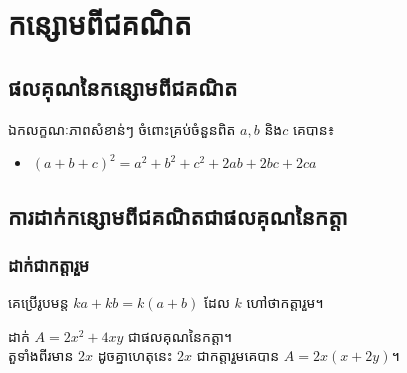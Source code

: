 \chapter{កន្សោមពីជគណិត}
\section{ផលគុណនៃកន្សោមពីជគណិត}
\begin{property}{ឯកលក្ខណៈភាពសំខាន់ៗ}
ចំពោះគ្រប់ចំនួនពិត $a,b$ និង$c$ គេបាន៖
\begin{itemize}
\item $(a+b+c)^2=a^2+b^2+c^2+2ab+2bc+2ca$
\end{itemize}
\end{property}
\section{ការដាក់កន្សោមពីជគណិតជាផលគុណនៃកត្តា}
\subsection{ដាក់ជាកត្តារួម}
\begin{generality}
គេប្រើរូបមន្ត $ka+kb=k(a+b)$ ដែល $k$ ហៅថាកត្តារួម។
\end{generality}
\begin{example}
ដាក់ $A=2x^2+4xy$ ជាផលគុណនៃកត្តា។ \\តួទាំងពីរមាន $2x$ ដូចគ្នាហេតុនេះ $2x$ ជាកត្តារួមគេបាន $A=2x(x+2y)$។
\end{example}
